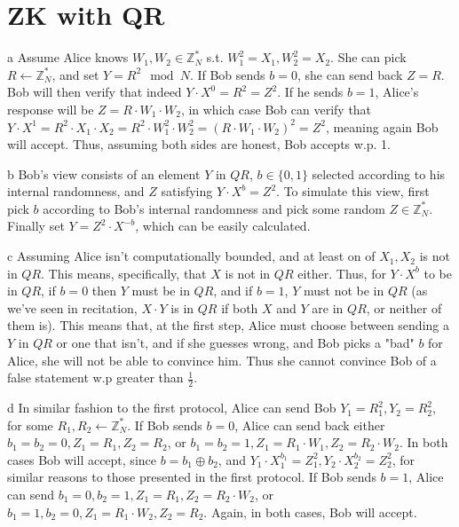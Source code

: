 \documentclass{article}
\begin{document}
\section{ZK with QR}
\begin{paragraph}
    a Assume Alice knows \(W_1, W_2 \in \mathbb{Z}^*_N\) s.t. \(W_1^2 = X_1, W_2^2 = X_2\). She can pick \(R \leftarrow \mathbb{Z}^*_N\), and set \(Y = R^2 \mod{N}\). If Bob sends \(b = 0\), she can send back \(Z = R\). Bob will then verify that indeed \(Y \cdot X^0 = R^2 = Z^2\). If he sends \(b = 1\), Alice's response will be \(Z = R \cdot W_1 \cdot W_2\), in which case Bob can verify that \(Y \cdot X^1 = R^2 \cdot X_1 \cdot X_2 = R^2 \cdot W_1^2 \cdot W_2^2 = (R \cdot W_1 \cdot W_2)^2 = Z^2\), meaning again Bob will accept. Thus, assuming both sides are honest, Bob accepts w.p. 1.
\end{paragraph}

\begin{paragraph}
    b Bob's view consists of an element \(Y\) in \(QR\), \(b \in \{0, 1\}\) selected according to his internal randomness, and \(Z\) satisfying \(Y \cdot X^b = Z^2\). To simulate this view, first pick \(b\) according to Bob's internal randomness and pick some random \(Z \in \mathbb{Z}^*_N\). Finally set \(Y = Z^2 \cdot X^{-b}\), which can be easily calculated.
\end{paragraph}

\begin{paragraph}
    c Assuming Alice isn't computationally bounded, and at least on of \(X_1, X_2\) is not in \(QR\). This means, specifically, that \(X\) is not in \(QR\) either. Thus, for \(Y \cdot X^b\) to be in \(QR\), if \(b = 0\) then \(Y\) must be in \(QR\), and if \(b = 1\), \(Y\) must not be in \(QR\) (as we've seen in recitation, \(X \cdot Y\) is in \(QR\) if both \(X\) and \(Y\) are in \(QR\), or neither of them is). This means that, at the first step, Alice must choose between sending a \(Y\) in \(QR\) or one that isn't, and if she guesses wrong, and Bob picks a "bad" \(b\) for Alice, she will not be able to convince him. Thus she cannot convince Bob of a false statement w.p greater than \(\frac{1}{2}\).
\end{paragraph}

\begin{paragraph}
    d In similar fashion to the first protocol, Alice can send Bob \(Y_1 = R_1^2, Y_2 = R_2^2\), for some \(R_1, R_2 \leftarrow \mathbb{Z}^*_N\). If Bob sends \(b = 0\), Alice can send back either \(b_1 = b_2 = 0, Z_1 = R_1, Z_2 = R_2\), or \(b_1 = b_2 = 1, Z_1 = R_1 \cdot W_1, Z_2 = R_2 \cdot W_2\). In both cases Bob will accept, since \(b = b_1 \oplus b_2\), and \(Y_1 \cdot X_1 ^ {b_1} = Z_1^2, Y_2 \cdot X_2 ^{b_2} = Z_2^2\), for similar reasons to those presented in the first protocol. If Bob sends \(b = 1\), Alice can send \(b_1 = 0, b_2 = 1, Z_1 = R_1, Z_2 = R_2 \cdot W_2\), or \(b_1 = 1, b_2 = 0, Z_1 = R_1 \cdot W_2, Z_2 = R_2\). Again, in both cases, Bob will accept.
\end{paragraph}
\end{document}

